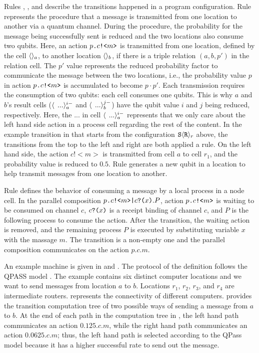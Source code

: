 Rules , , and  describe the transitions happened in a program configuration.
Rule  represents the procedure that a message is transmitted from one location to another via a quantum channel. During the procedure, the probability for the message being successfully sent is reduced and the two locations also consume two qubits.
Here, an action $p\texttt{.}c\texttt{!<}m\texttt{>}$ is transmitted from one location, defined by the cell $\langle  \rangle_a$, to another location $\langle  \rangle_b$, if there is a triple relation $(a,b,p')$ in the relation cell. 
The $p'$ value represents the reduced probability factor to communicate the message between the two locations, i.e.,
the probability value $p$ in action $p\texttt{.}c\texttt{!<}m\texttt{>}$ is accumulated to become $p\cdot p'$.
Each transmission requires the consumption of two qubits: each cell consumes one qubits.
This is why $a$ and $b$'s result cells ($\langle  \, \;...\rangle^{i-}_{a}$ and $\langle  \, \;...\rangle^{j-}_{b}$) have the qubit value $i$ and $j$ being reduced, respectively.
Here, the $...$ in cell $\langle  \, \;...\rangle^{i-}_{a}$ represents that we only care about the left hand side action in a process cell regarding the rest of the content.
In the example transition in  that starts from the configuration $\texttt{S} \langle \texttt{R} \rangle_r$ above,
the transitions from the top to the left and right are both applied a  rule.
On the left hand side, the action $c!<m>$ is transmitted from cell $a$ to cell $r_1$, and the probability value is reduced to $0.5$.
Rule  generates a new qubit in a location to help transmit messages from one location to another.

Rule  defines the behavior of consuming a message by a local process in a node cell.
In the parallel composition $p\texttt{.}c\texttt{!<}m\texttt{>}\texttt{|} c\texttt{?(}x\texttt{)}.P$, action $p\texttt{.}c\texttt{!<}m\texttt{>}$ is waiting to be consumed on channel $c$, 
$c\texttt{?(}x\texttt{)}$ is a receipt binding of channel $c$, and $P$ is the following process to consume the action.
After the transition, the waiting action is removed, and the remaining process $P$ is executed by substituting variable $x$ with the massage $m$. The transition is a non-empty one and the parallel composition communicates on the action $p.c.m$.

An example machine is given in  and .
The protocol of the definition follows the QPASS model \cite{10.1145/3387514.3405853}. 
The example contains six distinct computer locations and we want to send messages from location $a$ to $b$.
Locations $r_1$, $r_2$, $r_3$, and $r_4$ are intermediate routers. 
 represents the connectivity of different computers. 
 provides the transition computation tree of two possible ways of sending a message from $a$ to $b$.
At the end of each path in the computation tree in , the left hand path communicates an action $0.125.c.m$, while the right hand path communicates an action $0.0625.c.m$; thus, the left hand path is selected according to the QPass model because it has a higher successful rate to send out the message.



